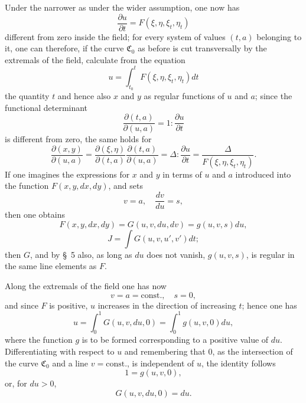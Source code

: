 \documentclass[11pt,a4paper,leqno]{article}
\begin{document}
Under the narrower as under the wider assumption, one now has
\[
\frac{\partial u}{\partial t}=F(\xi,\eta,\xi_t,\eta_t)
\]
different from zero inside the field; for every system of values $(t,a)$ belonging to it, one can therefore, if the curve $\mathfrak{C}_0$ as before is cut transversally by the extremals of the field, calculate from the equation
\[
u=\int_{t_0}^{t}F(\xi,\eta,\xi_t,\eta_t)dt
\]
the quantity $t$ and hence also $x$ and $y$ as regular functions of $u$ and $a$; since the functional determinant
\[
\frac{\partial(t,a)}{\partial(u,a)}=1:\frac{\partial u}{\partial t}
\]
is different from zero, the same holds for
\begin{equation}\tag{36}
\frac{\partial(x,y)}{\partial(u,a)}
=\frac{\partial(\xi,\eta)}{\partial(t,a)}\frac{\partial(t,a)}{\partial(u,a)}
=\Delta:\frac{\partial u}{\partial t}
=\frac{\Delta}{F(\xi,\eta,\xi_t,\eta_t)}.
\end{equation}
If one imagines the expressions for $x$ and $y$ in terms of $u$ and $a$ introduced into the function $F(x,y,dx,dy)$, and sets
\[
v=a,
\quad \frac{dv}{du}=s,
\]
then one obtains
\[
F(x,y,dx,dy)=G(u,v,du,dv)=g(u,v,s)du,
\]
\[
J=\int G(u,v,u',v')dt;
\]
then $G$, and by \S~5 also, as long as $du$ does not vanish, $g(u,v,s)$, is regular in the same line elements as $F$.

Along the extremals of the field one has now
\[
v=a=\text{const.},\quad s=0,
\]
and since $F$ is positive, $u$ increases in the direction of increasing $t$; hence one has
\[
u=\int_0^1G(u,v,du,0)=\int_0^1g(u,v,0)du,
\]
where the function $g$ is to be formed corresponding to a positive value of $du$. Differentiating with respect to $u$ and remembering that 0, as the intersection of the curve $\mathfrak{C}_0$ and a line $v=\text{const.}$, is independent of $u$, the identity follows
\[
1=g(u,v,0),
\]
or, for $du>0$,
\[
G(u,v,du,0)=du.
\]
\end{document}
